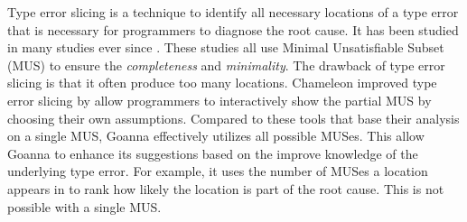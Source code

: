 Type error slicing \cite{Haack2004-fr} is a technique to identify all necessary locations of a type error that is necessary for programmers to diagnose the root cause. It has been studied in many studies ever since \cite{Tip2001-qn, Heeren2003-kd}. These studies all use Minimal Unsatisfiable Subset (MUS) to ensure the \textit{completeness} and \textit{minimality}. The drawback of type error slicing is that it often produce too many locations.  Chameleon \cite{Stuckey2003-pz,Fu2021-xd} improved type error slicing by allow programmers to interactively show the partial MUS by choosing their own assumptions. Compared to these tools that base their analysis on a single MUS, Goanna effectively utilizes all possible MUSes. This allow Goanna to enhance its suggestions based on the improve knowledge of the underlying type error. For example, it uses the number of MUSes a location appears in to rank how likely the location is part of the root cause. This is not possible with a single MUS.  
%   


